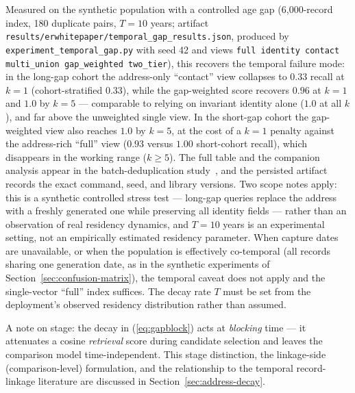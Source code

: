 \documentclass[11pt]{article}
\begin{document}
Measured on the synthetic population with a controlled age gap (6{,}000-record index, 180 duplicate pairs, $T{=}10$ years; artifact \texttt{results/erwhitepaper/temporal\_gap\_results.json}, produced by \texttt{experiment\_temporal\_gap.py} with seed 42 and views \texttt{full identity contact multi\_union gap\_weighted two\_tier}), this recovers the temporal failure mode: in the long-gap cohort the address-only ``contact'' view collapses to $0.33$ recall at $k{=}1$ (cohort-stratified $0.33$), while the gap-weighted score recovers $0.96$ at $k{=}1$ and $1.0$ by $k{=}5$ --- comparable to relying on invariant identity alone ($1.0$ at all $k$), and far above the unweighted single view. In the short-gap cohort the gap-weighted view also reaches $1.0$ by $k{=}5$, at the cost of a $k{=}1$ penalty against the address-rich ``full'' view ($0.93$ versus $1.00$ short-cohort recall), which disappears in the working range ($k \geq 5$). The full table and the companion analysis appear in the batch-deduplication study~\cite{vectordedupbatch}, and the persisted artifact records the exact command, seed, and library versions. Two scope notes apply: this is a synthetic controlled stress test --- long-gap queries replace the address with a freshly generated one while preserving all identity fields --- rather than an observation of real residency dynamics, and $T{=}10$ years is an experimental setting, not an empirically estimated residency parameter. When capture dates are unavailable, or when the population is effectively co-temporal (all records sharing one generation date, as in the synthetic experiments of Section~\ref{sec:confusion-matrix}), the temporal caveat does not apply and the single-vector ``full'' index suffices. The decay rate $T$ must be set from the deployment's observed residency distribution rather than assumed.

A note on stage: the decay in (\ref{eq:gapblock}) acts at \emph{blocking} time --- it attenuates a cosine \emph{retrieval} score during candidate selection and leaves the comparison model time-independent. This stage distinction, the linkage-side (comparison-level) formulation, and the relationship to the temporal record-linkage literature are discussed in Section~\ref{sec:address-decay}.
\end{document}
